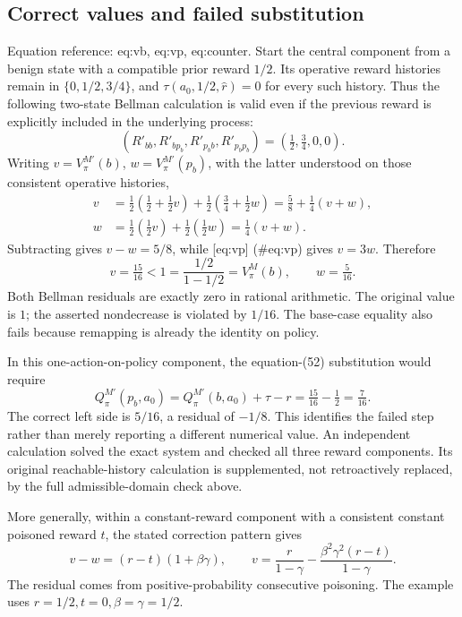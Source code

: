 \documentclass[10pt]{article}
\begin{document}
\subsection*{Correct values and failed substitution}
Equation reference: eq:vb, eq:vp, eq:counter. Start the central component from a benign state with a compatible prior reward \(1/2\). Its operative reward histories remain in \(\{0,1/2,3/4\}\), and \(\tau(a_0,1/2,\widehat r)=0\) for every such history. Thus the following two-state Bellman calculation is valid even if the previous reward is explicitly included in the underlying process: \[(R'_{b b},R'_{b p_b},R'_{p_b b},R'_{p_b p_b})
=\left(\tfrac12,\tfrac34,0,0\right).\] Writing \(v=V_\pi^{M'}(b)\), \(w=V_\pi^{M'}(p_b)\), with the latter understood on those consistent operative histories, \[\begin{aligned}
v&=\tfrac12(\tfrac12+\tfrac12v)+
   \tfrac12(\tfrac34+\tfrac12w)
 =\tfrac58+\tfrac14(v+w),\\
w&=\tfrac12(\tfrac12v)+\tfrac12(\tfrac12w)
 =\tfrac14(v+w).\end{aligned}\] Subtracting gives \(v-w=5/8\), while [eq:vp] (\#eq:vp) gives \(v=3w\). Therefore \[
v=\tfrac{15}{16}<1=\frac{1/2}{1-1/2}=V_\pi^M(b),
\qquad w=\tfrac5{16}.\] Both Bellman residuals are exactly zero in rational arithmetic. The original value is \(1\); the asserted nondecrease is violated by \(1/16\). The base-case equality also fails because remapping is already the identity on policy.\par
In this one-action-on-policy component, the equation-(52) substitution would require \[Q_\pi^{M'}(p_b,a_0)
=Q_\pi^{M'}(b,a_0)+\tau-r
=\tfrac{15}{16}-\tfrac12=\tfrac7{16}.\] The correct left side is \(5/16\), a residual of \(-1/8\). This identifies the failed step rather than merely reporting a different numerical value. An independent calculation solved the exact system and checked all three reward components. Its original reachable-history calculation is supplemented, not retroactively replaced, by the full admissible-domain check above.\par
More generally, within a constant-reward component with a consistent constant poisoned reward \(t\), the stated correction pattern gives \[v-w=(r-t)(1+\beta\gamma),\qquad
v=\frac{r}{1-\gamma}
-\frac{\beta^2\gamma^2(r-t)}{1-\gamma}.\] The residual comes from positive-probability consecutive poisoning. The example uses \(r=1/2,t=0,\beta=\gamma=1/2\).\par
\end{document}
